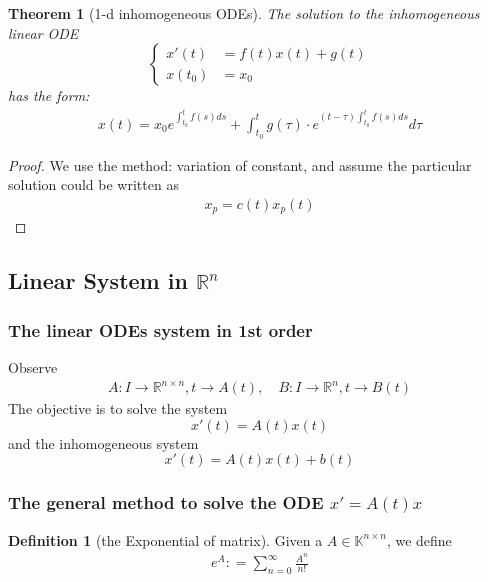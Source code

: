 \documentclass[12pt,fleqn]{book}
\newtheorem{theorem}{Theorem}[section]
\theoremstyle{definition}
\newtheorem{definition}{Definition}[section]
\begin{document}
\begin{theorem}[1-d inhomogeneous ODEs]
	The solution to the inhomogeneous linear ODE
		\begin{equation*}
	\left\{
	\begin{aligned}
		x'(t) &= f(t)x(t) + g(t)\\
		x(t_0) &= x_0
	\end{aligned}
	\right.
	\end{equation*}
	has the form:
	\begin{align*}
		x(t) = x_0 e^{\int_{t_0}^{t} f(s) ds } + \int_{t_0}^t g(\tau) \cdot e^{(t - \tau) \int_{t_0}^t f(s)ds} d\tau
	\end{align*}
\end{theorem}
\begin{proof}
	We use the method: variation of constant, and assume the particular solution could be written as 
	\begin{align*}
		x_p = c(t) x_p(t)
	\end{align*}
\end{proof}

\subsection{Linear System in $\mathbb{R}^n$}


\subsubsection*{The linear ODEs system in 1st order}
Observe
\begin{align*}
	A: I \rightarrow \mathbb{R}^{n \times n}, t \rightarrow A(t) ,\quad B: I \rightarrow \mathbb{R}^n, t \rightarrow B(t)
\end{align*}
The objective is to solve the system
\begin{equation}
x'(t) = A(t) x(t)	
\end{equation}
and the inhomogeneous system
\begin{equation}
	x'(t) = A(t) x(t) + b(t)
\end{equation}

\subsubsection{The general method to solve the ODE $x' = A(t) x$ }
\begin{definition}[the Exponential of matrix]
	Given a $A \in \mathbb{K}^{n \times n}$, we define
	\begin{align*}
		e^A : = \sum^{\infty}_{n = 0} \frac{A^n}{n!} 
	\end{align*}
\end{definition}
\end{document}
